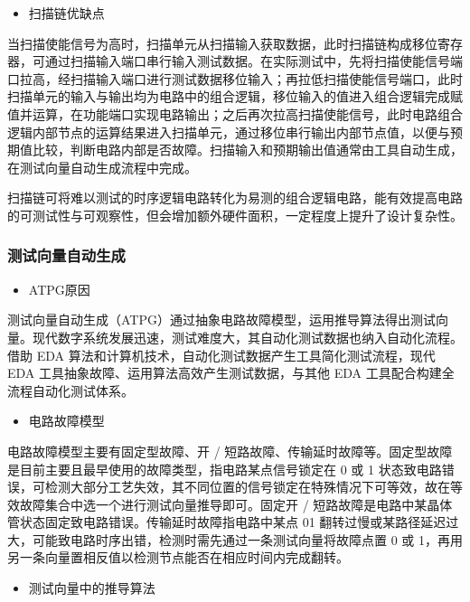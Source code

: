 \begin{itemize}
\tightlist
\item
  扫描链优缺点
\end{itemize}

当扫描使能信号为高时，扫描单元从扫描输入获取数据，此时扫描链构成移位寄存器，可通过扫描输入端口串行输入测试数据。在实际测试中，先将扫描使能信号端口拉高，经扫描输入端口进行测试数据移位输入；再拉低扫描使能信号端口，此时扫描单元的输入与输出均为电路中的组合逻辑，移位输入的值进入组合逻辑完成赋值并运算，在功能端口实现电路输出；之后再次拉高扫描使能信号，此时电路组合逻辑内部节点的运算结果进入扫描单元，通过移位串行输出内部节点值，以便与预期值比较，判断电路内部是否故障。扫描输入和预期输出值通常由工具自动生成，在测试向量自动生成流程中完成。

扫描链可将难以测试的时序逻辑电路转化为易测的组合逻辑电路，能有效提高电路的可测试性与可观察性，但会增加额外硬件面积，一定程度上提升了设计复杂性。

\subsubsection{测试向量自动生成}\label{sec:16-chip-frontend-030}

\begin{itemize}
\tightlist
\item
  ATPG原因
\end{itemize}

测试向量自动生成（ATPG）通过抽象电路故障模型，运用推导算法得出测试向量。现代数字系统发展迅速，测试难度大，其自动化测试数据也纳入自动化流程。借助
EDA 算法和计算机技术，自动化测试数据产生工具简化测试流程，现代 EDA
工具抽象故障、运用算法高效产生测试数据，与其他 EDA
工具配合构建全流程自动化测试体系。

\begin{itemize}
\tightlist
\item
  电路故障模型
\end{itemize}

电路故障模型主要有固定型故障、开 /
短路故障、传输延时故障等。固定型故障是目前主要且最早使用的故障类型，指电路某点信号锁定在
0 或 1
状态致电路错误，可检测大部分工艺失效，其不同位置的信号锁定在特殊情况下可等效，故在等效故障集合中选一个进行测试向量推导即可。固定开
/ 短路故障是电路中某晶体管状态固定致电路错误。传输延时故障指电路中某点
01
翻转过慢或某路径延迟过大，可能致电路时序出错，检测时需先通过一条测试向量将故障点置
0 或 1，再用另一条向量置相反值以检测节点能否在相应时间内完成翻转。

\begin{itemize}
\tightlist
\item
  测试向量中的推导算法
\end{itemize}

